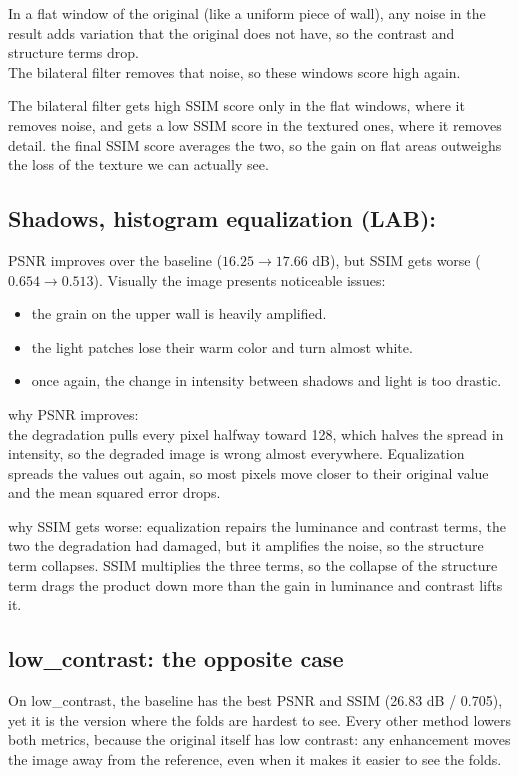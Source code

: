 \documentclass[11pt,a4paper]{article}
\begin{document}
In a flat window of the original (like a uniform piece of wall), any noise in the result adds variation that the original does not have, so the contrast and structure terms drop.\\
The bilateral filter removes that noise, so these windows score high again.

The bilateral filter gets high SSIM score only in the flat windows, where it removes noise, and gets a low SSIM score in the textured ones, where it removes detail.
the final SSIM score averages the two, so the gain on flat areas outweighs the loss of the texture we can actually see.

\subsection{Shadows, histogram equalization (LAB):}

PSNR improves over the baseline ($16.25 \rightarrow 17.66$ dB), but SSIM gets worse ($0.654 \rightarrow 0.513$). Visually the image presents noticeable issues:
\begin{itemize}
  \item the grain on the upper wall is heavily amplified.
  \item the light patches lose their warm color and turn almost white.
  \item once again, the change in intensity between shadows and light is too drastic.
\end{itemize}

why PSNR improves:\\
the degradation pulls every pixel halfway toward 128, which halves the spread in intensity, so the degraded image is wrong almost everywhere.
Equalization spreads the values out again, so most pixels move closer to their original value and the mean squared error drops.

why SSIM gets worse: equalization repairs the luminance and contrast terms, the two the degradation had damaged, but it amplifies the noise, so the structure term collapses. SSIM multiplies the three terms, so the collapse of the structure term drags the product down more than the gain in luminance and contrast lifts it.

\subsection{low\_contrast: the opposite case}

On low\_contrast, the baseline has the best PSNR and SSIM (26.83 dB / 0.705), yet it is the version where the folds are hardest to see.
Every other method lowers both metrics, because the original itself has low contrast: any enhancement moves the image away from the reference, even when it makes it easier to see the folds.
\end{document}
